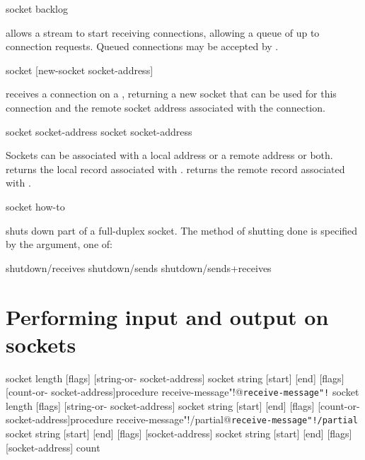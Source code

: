  {socket backlog} \undefined
\begin{desc}
 allows a stream  to start receiving connections,
allowing a queue of up to  connection requests. Queued
connections may be accepted by .
\end{desc}

 {socket} {[new-socket socket-address]}
\begin{desc}
 receives a connection on a , returning
a new socket that can be used for this connection and the remote socket
address associated with the connection.
\end{desc}

 {socket} {socket-address}
 {socket} {socket-address}
\begin{desc}
Sockets can be associated with a local address or a remote address or
both.  returns the local 
record associated with .  returns
the remote  record associated with .
\end{desc}

 {socket how-to} \undefined
\begin{desc}

 shuts down part of a full-duplex socket.
The method of shutting done is specified by the  argument,
one of:
\begin{code}\codeallowbreaks
shutdown/receives
shutdown/sends
shutdown/sends+receives\end{code}
\end{desc}

\section{Performing input and output on sockets}

 {socket length [flags]} {[string-or-\sharpf{} socket-address]}
 {socket string [start] [end] [flags]}
        {[count-or-\sharpf{}  socket-address]}{procedure}
        {receive-message"!@\texttt{receive-message"!}}
 {socket length [flags]}
         {[string-or-\sharpf{} socket-address]}
 {socket string [start] [end] [flags]}
        {[count-or-\sharpf{} socket-address]}{procedure}
        {receive-message"!/partial@\texttt{receive-message"!/partial}}
 {socket string [start] [end] [flags] [socket-address]}
        \undefined
{} 
        {socket string [start] [end] [flags] [socket-address]} {count}

